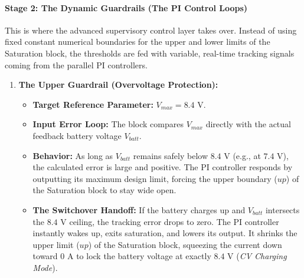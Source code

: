 \paragraph{Stage 2: The Dynamic Guardrails (The PI Control Loops)}
This is where the advanced supervisory control layer takes over. Instead of using fixed constant numerical boundaries for the upper and lower limits of the Saturation block, the thresholds are fed with variable, real-time tracking signals coming from the parallel PI controllers.

\begin{enumerate}
    \item \textbf{The Upper Guardrail (Overvoltage Protection):} 
    \begin{itemize}
        \item \textbf{Target Reference Parameter:} $V_{max} = 8.4\text{ V}$.
        \item \textbf{Input Error Loop:} The block compares $V_{max}$ directly with the actual feedback battery voltage $V_{batt}$.
        \item \textbf{Behavior:} As long as $V_{batt}$ remains safely below $8.4\text{ V}$ (e.g., at $7.4\text{ V}$), the calculated error is large and positive. The PI controller responds by outputting its maximum design limit, forcing the upper boundary ($up$) of the Saturation block to stay wide open.
        \item \textbf{The Switchover Handoff:} If the battery charges up and $V_{batt}$ intersects the $8.4\text{ V}$ ceiling, the tracking error drops to zero. The PI controller instantly wakes up, exits saturation, and lowers its output. It shrinks the upper limit ($up$) of the Saturation block, squeezing the current down toward $0\text{ A}$ to lock the battery voltage at exactly $8.4\text{ V}$ (\textit{CV Charging Mode}).
    \end{itemize}
    

\end{enumerate}
